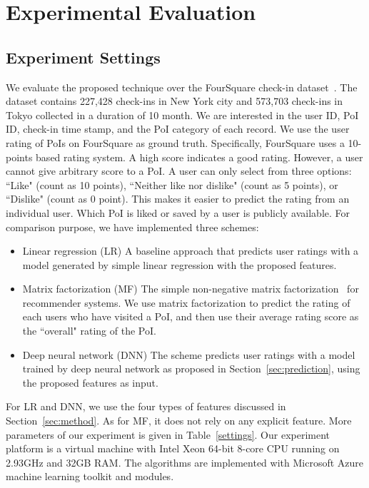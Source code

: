 \section{Experimental Evaluation}\label{sec:exp}

\subsection{Experiment Settings}

We evaluate the proposed technique over the FourSquare check-in dataset~\cite{yang2014modeling}. The dataset contains 227,428 check-ins in New York city and 573,703 check-ins in Tokyo collected in a duration of 10 month. We are interested in the user ID, PoI ID, check-in time stamp, and the PoI category of each record. We use the user rating of PoIs on FourSquare as ground truth. Specifically, FourSquare uses a 10-points based rating system. A high score indicates a good rating. However, a user cannot give arbitrary score to a PoI. A user can only select from three options: ``Like" (count as 10 points), ``Neither like nor dislike" (count as 5 points), or ``Dislike" (count as 0 point). This makes it easier to predict the rating from an individual user. Which PoI is liked or saved by a user is publicly available. For comparison purpose, we have implemented three schemes:
\begin{itemize}
\item{Linear regression (LR)} A baseline approach that predicts user ratings with a model generated by simple linear regression with the proposed features.
\item{Matrix factorization (MF)} The simple non-negative matrix factorization~\cite{koren2009matrix} for recommender systems. We use matrix factorization to predict the rating of each users who have visited a PoI, and then use their average rating score as the ``overall" rating of the PoI.
\item{Deep neural network (DNN)} The scheme predicts user ratings with a model trained by deep neural network as proposed in Section~\ref{sec:prediction}, using the proposed features as input.
\end{itemize}

For LR and DNN, we use the four types of features discussed in Section~\ref{sec:method}. As for MF, it does not rely on any explicit feature. More parameters of our experiment is given in Table~\ref{settings}. Our experiment platform is a virtual machine with Intel Xeon 64-bit 8-core CPU running on 2.93GHz and 32GB RAM. The algorithms are implemented with Microsoft Azure machine learning toolkit and modules. 


